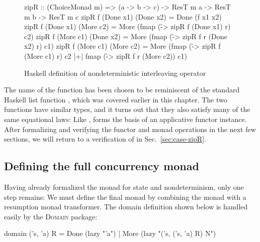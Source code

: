 \begin{figure}
\begin{hscode}
zipR :: (ChoiceMonad m) =>
    (a -> b -> c) -> ResT m a -> ResT m b -> ResT m c
zipR f (Done x1) (Done x2) = Done (f x1 x2)
zipR f (Done x1) (More c2) = More
                             (fmap (\r -> zipR f (Done x1) r) c2)
zipR f (More c1) (Done x2) = More
                             (fmap (\r -> zipR f r (Done x2) r) c1)
zipR f (More c1) (More c2) = More
                             (fmap (\r -> zipR f (More c1) r) c2 |+|
                              fmap (\r -> zipR f r (More c2)) c1)
\end{hscode}
\caption{Haskell definition of nondeterministic interleaving operator}
\label{fig:case-zipR}
\end{figure}

The name of the function  has been chosen to be reminiscent of the standard Haskell list function , which was covered earlier in this chapter. The two functions have similar types, and it turns out that they also satisfy many of the same equational laws: Like ,  forms the basis of an applicative functor instance. After formalizing and verifying the functor and monad operations in the next few sections, we will return to a verification of  in Sec.~\ref{sec:case-zipR}.

\subsection{Defining the full concurrency monad}
\label{sec:case-define-R}

Having already formalized the  monad for state and nondeterminism, only one step remains: We must define the final monad by combining the  monad with a resumption monad transformer. The domain definition shown below is handled easily by the \textsc{Domain} package:

\begin{isacode}
domain ('s, 'a) R = Done (lazy "'a") | More (lazy "('s, ('s, 'a) R) N")
\end{isacode}

